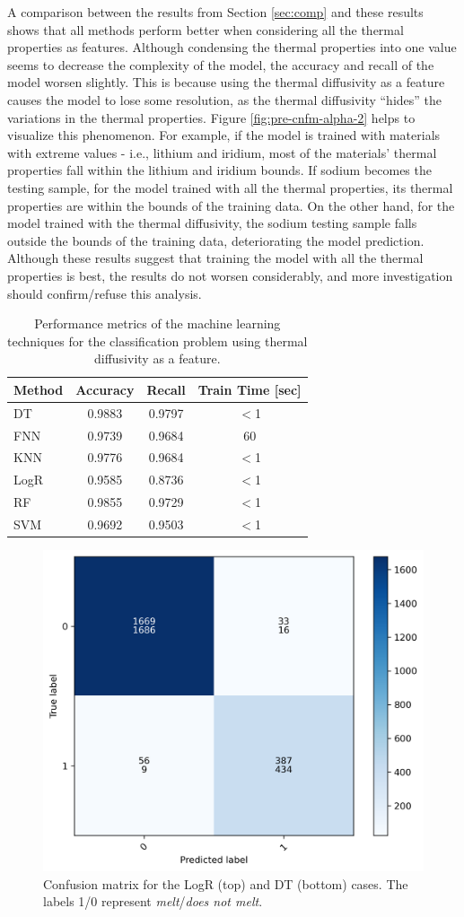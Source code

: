 A comparison between the results from Section \ref{sec:comp} and these results shows that all methods perform better when considering all the thermal properties as features.
Although condensing the thermal properties into one value seems to decrease the complexity of the model, the accuracy and recall of the model worsen slightly.
This is because using the thermal diffusivity as a feature causes the model to lose some resolution, as the thermal diffusivity ``hides'' the variations in the thermal properties.
Figure \ref{fig:pre-cnfm-alpha-2} helps to visualize this phenomenon.
For example, if the model is trained with materials with extreme values - i.e., lithium and iridium, most of the materials' thermal properties fall within the lithium and iridium bounds.
If sodium becomes the testing sample, for the model trained with all the thermal properties, its thermal properties are within the bounds of the training data.
On the other hand, for the model trained with the thermal diffusivity, the sodium testing sample falls outside the bounds of the training data, deteriorating the model prediction.
Although these results suggest that training the model with all the thermal properties is best, the results do not worsen considerably, and more investigation should confirm/refuse this analysis.

\begin{table}[htbp!]
  \centering
  \caption{Performance metrics of the machine learning techniques for the classification problem using thermal diffusivity as a feature.}
  \label{tab:res-pre-alpha}
  \begin{tabular}{lccc}
    \toprule
    Method & Accuracy & Recall & Train Time [sec] \\
    \midrule
    DT      & 0.9883 & 0.9797 & $<$1 \\
    FNN     & 0.9739 & 0.9684 &   60 \\
    KNN     & 0.9776 & 0.9684 & $<$1 \\
    LogR    & 0.9585 & 0.8736 & $<$1 \\
    RF      & 0.9855 & 0.9729 & $<$1 \\
    SVM     & 0.9692 & 0.9503 & $<$1 \\
    \bottomrule
  \end{tabular}
\end{table}

\begin{figure}[htbp!] %
    \centering
    \includegraphics[width=0.45\linewidth]{figures/classification-alpha_cnfm}
    \hfill
    \caption{Confusion matrix for the LogR (top) and DT (bottom) cases. The labels 1/0 represent \textit{melt}/\textit{does not melt}.}
    \label{fig:pre-cnfm-alpha}
\end{figure}

